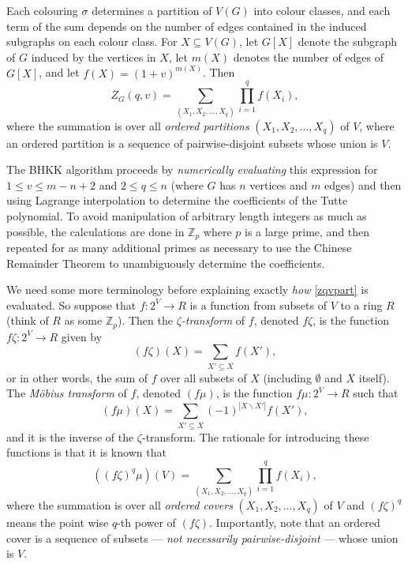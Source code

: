 Each colouring $\sigma$ determines a partition of $V(G)$ into colour classes, and each term of the sum depends on the number of edges contained in the induced subgraphs on each colour class. For $X \subseteq V(G)$, let $G[X]$ denote the subgraph of $G$ induced by the vertices in $X$, let $m(X)$ denotes the number of edges of $G[X]$, and let $f(X) = (1+v)^{m(X)}$.
Then
\begin{equation}\label{zqvpart}
Z_G (q,v) = \sum_{(X_1, X_2, \ldots, X_q)} \prod_{i=1}^q f(X_i),
\end{equation}
where the summation is over all {\em ordered partitions} $(X_1, X_2, \ldots, X_q)$ of $V$, where an ordered partition is a sequence of
pairwise-disjoint subsets whose union is $V$.

The BHKK algorithm proceeds by {\em numerically evaluating} this expression for $1 \leq v \leq m-n+2$ and $2 \leq q \leq n$ (where  
$G$ has $n$ vertices and $m$ edges) and then using Lagrange interpolation to determine the coefficients of the
Tutte polynomial. To avoid manipulation of arbitrary length integers as much as possible, the calculations are done in $\mathbb{Z}_p$ where
$p$ is a large prime, and then repeated for as many additional primes as necessary to use the Chinese Remainder Theorem to 
unambiguously determine the coefficients.

We need some more terminology before explaining exactly {\em how} \eqref{zqvpart} is evaluated. So suppose that $f:2^V \rightarrow R$ is
a function from subsets of $V$ to a ring $R$ (think of $R$ as some $\mathbb{Z}_p$).  Then the {\em $\zeta$-transform} of $f$, denoted $f\zeta$, is the function $f\zeta: 2^V \rightarrow R$ given by
\[
(f\zeta) (X) = \sum_{X' \subseteq X} f(X'),
\]
or in other words, the sum of $f$ over all subsets of $X$ (including $\emptyset$ and $X$ itself).  The {\em M\"obius transform} of $f$, denoted $(f\mu)$, is the function 
$f\mu: 2^V \rightarrow R$ such that 
\[
(f\mu)(X) = \sum_{X' \subseteq X} (-1)^{|X\backslash  X'|} f(X'),
\]
and it is the inverse of the $\zeta$-transform. The rationale for introducing these functions is that it is known that
\begin{equation}\label{zqvcover}
\left( (f\zeta)^q \mu \right) (V) = \sum_{(X_1, X_2, \ldots, X_q)} \prod_{i=1}^q f(X_i),
\end{equation}
where the summation is over all {\em ordered covers} $(X_1, X_2, \ldots, X_q)$ of $V$ and  $(f\zeta)^q$ means the point wise $q$-th power of $(f\zeta)$. Importantly, note that an ordered cover is a sequence of subsets --- {\em not necessarily pairwise-disjoint} --- whose union is $V$.

